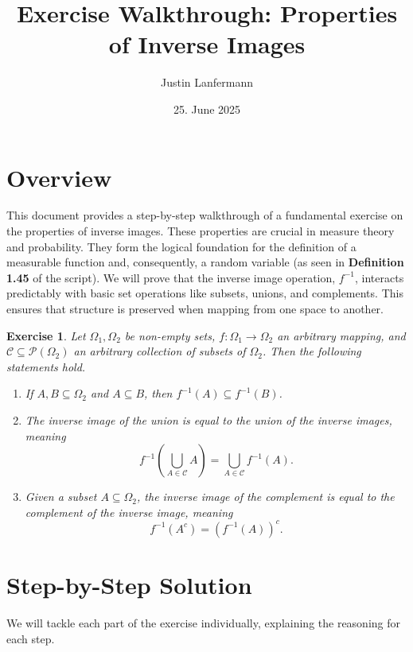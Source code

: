 \documentclass[11pt,a4paper]{article}
\title{Exercise Walkthrough: Properties of Inverse Images}
\author{Justin Lanfermann}
\date{25. June 2025}
\newtheorem{theorem}{Exercise}
\begin{document}
\maketitle

\section*{Overview}

This document provides a step-by-step walkthrough of a fundamental exercise on the properties of inverse images. These properties are crucial in measure theory and probability. They form the logical foundation for the definition of a measurable function and, consequently, a random variable (as seen in \textbf{Definition 1.45} of the script). We will prove that the inverse image operation, $f^{-1}$, interacts predictably with basic set operations like subsets, unions, and complements. This ensures that structure is preserved when mapping from one space to another.

\begin{theorem}
Let $\Omega_1, \Omega_2$ be non-empty sets, $f : \Omega_1 \to \Omega_2$ an arbitrary mapping, and $\mathcal{C} \subseteq \mathcal{P}(\Omega_2)$ an arbitrary collection of subsets of $\Omega_2$. Then the following statements hold.
\begin{enumerate}
    \item[(i)] If $A, B \subseteq \Omega_2$ and $A \subseteq B$, then $f^{-1}(A) \subseteq f^{-1}(B)$.
    \item[(ii)] The inverse image of the union is equal to the union of the inverse images, meaning
    \[ f^{-1}\left(\bigcup_{A \in \mathcal{C}} A\right) = \bigcup_{A \in \mathcal{C}} f^{-1}(A). \]
    \item[(iii)] Given a subset $A \subseteq \Omega_2$, the inverse image of the complement is equal to the complement of the inverse image, meaning
    \[ f^{-1}(A^c) = (f^{-1}(A))^c. \]
\end{enumerate}
\end{theorem}

\hrulefill
\vspace{1cm}

\section*{Step-by-Step Solution}

We will tackle each part of the exercise individually, explaining the reasoning for each step.
\end{document}

